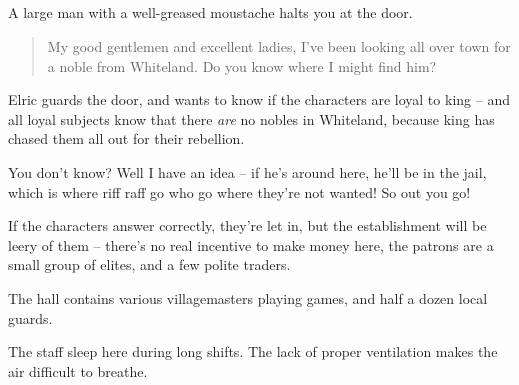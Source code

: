 
\humanpriest

\subsection{}


\setcounter{list}{0}

\begin{multicols}{2}


\begin{boxtext}

	A large man with a well-greased moustache halts you at the door.

	\begin{quotation}

		My good gentlemen and excellent ladies, I've been looking all over town for a noble from Whiteland.  Do you know where I might find him?

	\end{quotation}

\end{boxtext}

Elric guards the door, and wants to know if the characters are loyal to \gls{king} -- and all loyal subjects know that there \emph{are} no nobles in Whiteland, because \gls{king} has chased them all out for their rebellion.

\begin{speechtext}

	You don't know?  Well I have an idea -- if he's around here, he'll be in the jail, which is where riff raff go who go where they're not wanted!
	So out you go!

\end{speechtext}

If the characters answer correctly, they're let in, but the establishment will be leery of them -- there's no real incentive to make money here, the patrons are a small group of elites, and a few polite traders.

The hall contains various villagemasters playing games, and half a dozen local guards.


The staff sleep here during long shifts.  The lack of proper ventilation makes the air difficult to breathe.



\end{multicols}
